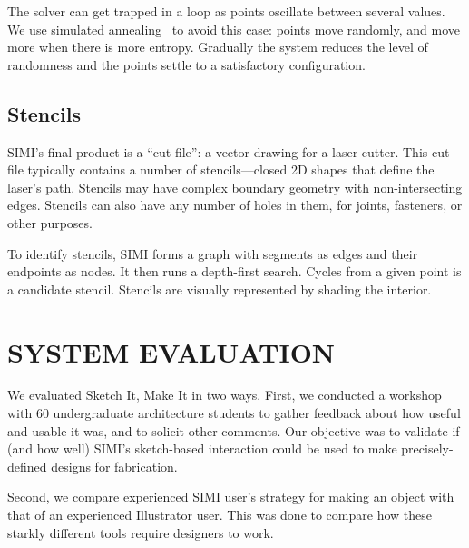 \documentclass{article}
\begin{document}
The solver can get trapped in a loop as points oscillate between
several values. We use simulated annealing~\cite{metropolis-annealing}
to avoid this case: points move randomly, and move more when there is
more entropy. Gradually the system reduces the level of randomness and
the points settle to a satisfactory configuration.

\subsection{Stencils}

SIMI's final product is a ``cut file'': a vector drawing for a laser
cutter. This cut file typically contains a number of stencils---closed
2D shapes that define the laser's path. Stencils may have complex
boundary geometry with non-intersecting edges. Stencils can also have
any number of holes in them, for joints, fasteners, or other purposes.

To identify stencils, SIMI forms a graph with segments as edges and
their endpoints as nodes. It then runs a depth-first search. Cycles
from a given point is a candidate stencil. Stencils are visually
represented by shading the interior.

\section{SYSTEM EVALUATION}

We evaluated Sketch It, Make It in two ways. First, we conducted a
workshop with 60 undergraduate architecture students to gather
feedback about how useful and usable it was, and to solicit other
comments. Our objective was to validate if (and how well) SIMI's
sketch-based interaction could be used to make precisely-defined
designs for fabrication.

Second, we compare experienced SIMI user's strategy for making an
object with that of an experienced Illustrator user. This was done to
compare how these starkly different tools require designers to work.
\end{document}
